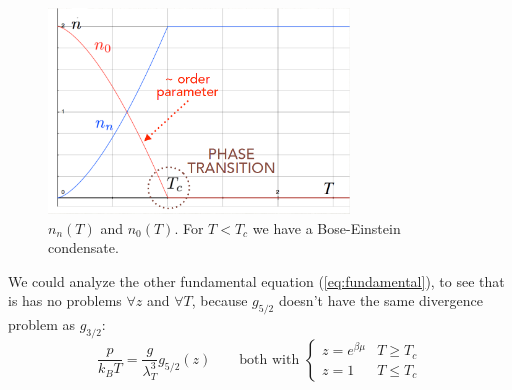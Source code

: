 \begin{figure}[ht]
    \centering
    \includegraphics[width = 8cm]{images/n0 and nn.png}
    \caption{$n_n(T)$ and $n_0(T)$. For $T < T_c$ we have a Bose-Einstein condensate.}
    \label{fig:n0-nn}
\end{figure}

We could analyze the other fundamental equation (\ref{eq:fundamental}), to see that is has no problems $\forall z$ and $\forall T$, because $g_{5/2}$ doesn't have the same divergence problem as $g_{3/2}$:
$$
    \frac p{k_BT} = \frac g{\lambda_T^3} g_{5/2}(z) \qquad \text{both with } \begin{cases}
        z= e^{\beta\mu} & T\ge T_c\\ z=1 & T \le T_c
    \end{cases} 
$$

